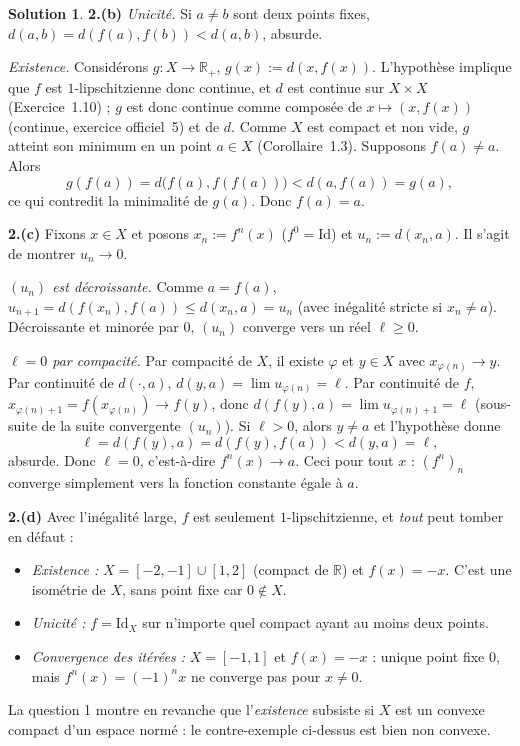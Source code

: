 \documentclass[11pt,a4paper]{article}
\newcommand{\R}{\mathbb{R}}
\newcommand{\ie}{c'est-à-dire}
\theoremstyle{definition}
\newtheorem*{solution}{Solution}
\begin{document}
\begin{solution}
\medskip
\noindent\textbf{2.(b)} \emph{Unicité.} Si $a\ne b$ sont deux points fixes, $d(a,b)=d(f(a),f(b))<d(a,b)$, absurde.

\emph{Existence.} Considérons $g:X\to\R_+$, $g(x):=d(x,f(x))$. L'hypothèse implique que $f$ est $1$-lipschitzienne donc continue, et $d$ est continue sur $X\times X$ (Exercice~1.10) ; $g$ est donc continue comme composée de $x\mapsto(x,f(x))$ (continue, exercice officiel~5) et de $d$. Comme $X$ est compact et non vide, $g$ atteint son minimum en un point $a\in X$ (Corollaire~1.3). Supposons $f(a)\ne a$. Alors
\[
g(f(a))=d\big(f(a),f(f(a))\big)<d(a,f(a))=g(a),
\]
ce qui contredit la minimalité de $g(a)$. Donc $f(a)=a$.

\medskip
\noindent\textbf{2.(c)} Fixons $x\in X$ et posons $x_n:=f^n(x)$ ($f^0=\mathrm{Id}$) et $u_n:=d(x_n,a)$. Il s'agit de montrer $u_n\to0$.

\emph{$(u_n)$ est décroissante.} Comme $a=f(a)$, $u_{n+1}=d(f(x_n),f(a))\le d(x_n,a)=u_n$ (avec inégalité stricte si $x_n\ne a$). Décroissante et minorée par $0$, $(u_n)$ converge vers un réel $\ell\ge0$.

\emph{$\ell=0$ par compacité.} Par compacité de $X$, il existe $\varphi$ et $y\in X$ avec $x_{\varphi(n)}\to y$. Par continuité de $d(\cdot,a)$, $d(y,a)=\lim u_{\varphi(n)}=\ell$. Par continuité de $f$, $x_{\varphi(n)+1}=f(x_{\varphi(n)})\to f(y)$, donc $d(f(y),a)=\lim u_{\varphi(n)+1}=\ell$ (sous-suite de la suite convergente $(u_n)$). Si $\ell>0$, alors $y\ne a$ et l'hypothèse donne
\[
\ell=d(f(y),a)=d(f(y),f(a))<d(y,a)=\ell ,
\]
absurde. Donc $\ell=0$, \ie{} $f^n(x)\to a$. Ceci pour tout $x$ : $(f^n)_n$ converge simplement vers la fonction constante égale à $a$.

\medskip
\noindent\textbf{2.(d)} Avec l'inégalité large, $f$ est seulement $1$-lipschitzienne, et \emph{tout} peut tomber en défaut :
\begin{itemize}
  \item \emph{Existence :} $X=[-2,-1]\cup[1,2]$ (compact de $\R$) et $f(x)=-x$. C'est une isométrie de $X$, sans point fixe car $0\notin X$.
  \item \emph{Unicité :} $f=\mathrm{Id}_X$ sur n'importe quel compact ayant au moins deux points.
  \item \emph{Convergence des itérées :} $X=[-1,1]$ et $f(x)=-x$ : unique point fixe $0$, mais $f^n(x)=(-1)^nx$ ne converge pas pour $x\ne0$.
\end{itemize}
La question 1 montre en revanche que l'\emph{existence} subsiste si $X$ est un convexe compact d'un espace normé : le contre-exemple ci-dessus est bien non convexe.
\end{solution}
\end{document}
